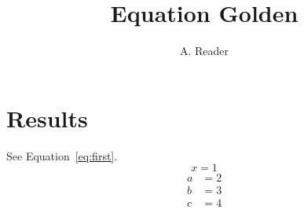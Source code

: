 \documentclass{article}
\title{Equation Golden}
\author{A. Reader}
\begin{document}
\section{Results}\label{sec:results}
See Equation~\eqref{eq:first}.
\begin{equation}\label{eq:first}x=1\end{equation}
\begin{align}
a &= 2\label{eq:second}\\
b &= 3\nonumber\\
c &= 4
\end{align}
\end{document}
